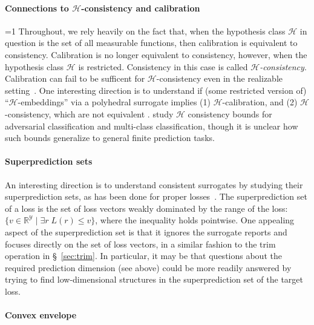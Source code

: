 \documentclass[twoside,11pt]{article}
\newcommand{\CommentsR}{1}
\newcommand{\reviewerresponse}[2]{\ifnum\CommentsR=1%
  \todo[linecolor=#1!80!black,backgroundcolor=#1,bordercolor=#1!80!black]{#2}\fi}
\newcommand{\reviewertwo}[1]{\reviewerresponse{blue!20!white}{R2: #1}}
\newcommand{\reals}{\mathbb{R}}
\renewcommand{\H}{\mathcal{H}}
\newcommand{\Y}{\mathcal{Y}}
\begin{document}
\paragraph{Connections to $\H$-consistency and calibration}
\reviewertwo{A}
Throughout, we rely heavily on the fact that, when the hypothesis class $\H$ in question is the set of all measurable functions, then calibration is equivalent to consistency.
Calibration is no longer equivalent to consistency, however, when the hypothesis class $\H$ is restricted.
Consistency in this case is called \emph{$\H$-consistency}.
Calibration can fail to be sufficent for $\H$-consistency even in the realizable setting~\citep{long2013consistency,kuznetov2014multiclass,zhang2020bayes}.
One interesting direction is to understand if (some restricted version of) ``$\H$-embeddings'' via a polyhedral surrogate implies (1) $\H$-calibration, and (2) $\H$-consistency, which are not equivalent \citep{awasthi2021calibration,awasthi2021finer}.
\citet{awasthi2022hconsistency,awasthi2022multi} study $\H$ consistency bounds for adversarial classification and multi-class classification, though it is unclear how such bounds generalize to general finite prediction tasks.


\paragraph{Superprediction sets}

An interesting direction is to understand consistent surrogates by studying their superprediction sets, as has been done for proper losses~\citep{williamson2014geometry}.
The superprediction set of a loss is the set of loss vectors weakly dominated by the range of the loss: $\{v \in \reals^\Y \mid \exists r\; L(r) \leq v\}$, where the inequality holds pointwise.
One appealing aspect of the superprediction set is that it ignores the surrogate reports and focuses directly on the set of loss vectors, in a similar fashion to the trim operation in \S~\ref{sec:trim}.
In particular, it may be that questions about the required prediction dimension (see above) could be more readily answered by trying to find low-dimensional structures in the superprediction set of the target loss.


\paragraph{Convex envelope}
\end{document}
